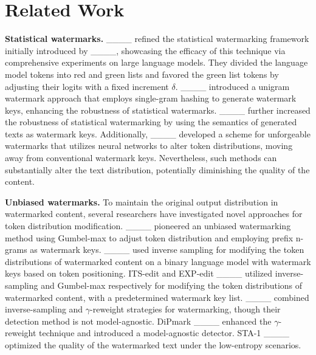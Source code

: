 \section{Related Work}
\textbf{Statistical watermarks.} ____ refined the statistical watermarking framework initially introduced by ____, showcasing the efficacy of this technique via comprehensive experiments on large language models. They divided the language model tokens into red and green lists and favored the green list tokens by adjusting their logits with a fixed increment $\delta$. ____ introduced a unigram watermark approach that employs single-gram hashing to generate watermark keys, enhancing the robustness of statistical watermarks. ____ further increased the robustness of statistical watermarking by using the semantics of generated texts as watermark keys. Additionally, ____ developed a scheme for unforgeable watermarks that utilizes neural networks to alter token distributions, moving away from conventional watermark keys. Nevertheless, such methods can substantially alter the text distribution, potentially diminishing the quality of the content.

\noindent\textbf{Unbiased watermarks.} To maintain the original output distribution in watermarked content, several researchers have investigated novel approaches for token distribution modification. ____ pioneered an unbiased watermarking method using Gumbel-max to adjust token distribution and employing prefix n-grams as watermark keys. ____ used inverse sampling for modifying the token distributions of watermarked content on a binary language model with watermark keys based on token positioning. ITS-edit and EXP-edit ____ utilized inverse-sampling and Gumbel-max respectively for modifying the token distributions of watermarked content, with a predetermined watermark key list. ____ combined inverse-sampling and $\gamma$-reweight strategies for watermarking, though their detection method is not model-agnostic. DiPmark ____ enhanced the $\gamma$-reweight technique and introduced a model-agnostic detector. STA-1 ____ optimized the quality of the watermarked text under the low-entropy scenarios.